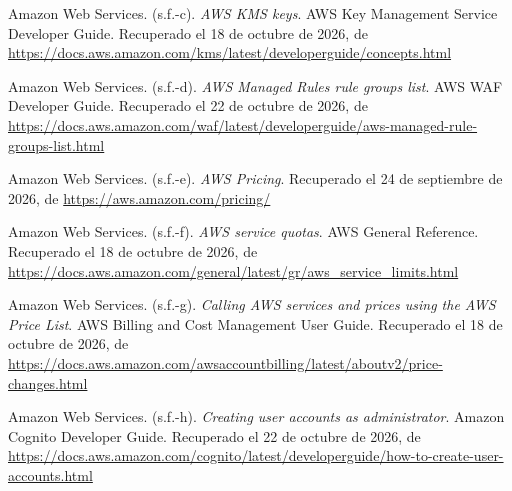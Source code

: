 \documentclass[12pt, a4paper]{article}
\begin{document}
\begin{list}{}{\setlength{\leftmargin}{1.27cm}\setlength{\itemindent}{-1.27cm}%
  \setlength{\labelwidth}{0pt}\setlength{\labelsep}{0pt}\setlength{\itemsep}{6pt}}
 
\item Amazon Web Services. (s.f.-c). \textit{AWS KMS keys}. AWS Key
  Management Service Developer Guide. Recuperado el 18 de octubre de 2026, de \url{https://docs.aws.amazon.com/kms/latest/developerguide/concepts.html}
 
 
\item Amazon Web Services. (s.f.-d). \textit{AWS Managed Rules rule
  groups list}. AWS WAF Developer Guide. Recuperado el 22 de octubre de 2026, de \url{https://docs.aws.amazon.com/waf/latest/developerguide/aws-managed-rule-groups-list.html}
 
 
\item Amazon Web Services. (s.f.-e). \textit{AWS Pricing}. Recuperado el
  24 de septiembre de 2026, de \url{https://aws.amazon.com/pricing/}
 
 
\item Amazon Web Services. (s.f.-f). \textit{AWS service quotas}. AWS General Reference. Recuperado el 18 de octubre de 2026, de \url{https://docs.aws.amazon.com/general/latest/gr/aws_service_limits.html}
 
 
\item Amazon Web Services. (s.f.-g). \textit{Calling AWS services and
  prices using the AWS Price List}. AWS Billing and Cost Management
  User Guide. Recuperado el 18 de octubre de 2026, de \url{https://docs.aws.amazon.com/awsaccountbilling/latest/aboutv2/price-changes.html}
 

\item Amazon Web Services. (s.f.-h). \textit{Creating user accounts as
  administrator}. Amazon Cognito Developer Guide. Recuperado el 22 de octubre de 2026, de \url{https://docs.aws.amazon.com/cognito/latest/developerguide/how-to-create-user-accounts.html}
 

\end{list}
\end{document}
